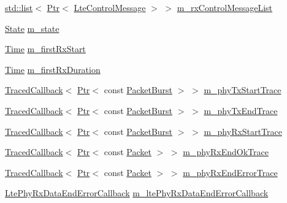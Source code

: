 \begin{DoxyCompactItemize}
\hyperlink{openflow-interface_8h_afd9bcfa176617760671b67580f536fa7}{std\+::list}$<$ \hyperlink{classns3_1_1Ptr}{Ptr}$<$ \hyperlink{classns3_1_1LteControlMessage}{Lte\+Control\+Message} $>$ $>$ \hyperlink{classns3_1_1LteSpectrumPhy_ad0e520fb4b440e47e9d2b17b3c5fd05d}{m\+\_\+rx\+Control\+Message\+List}
\item 
\hyperlink{classns3_1_1LteSpectrumPhy_a52ce2cf9b4846807449c50399f6b8000}{State} \hyperlink{classns3_1_1LteSpectrumPhy_a985b6688f1bbfcd8703096040b5c9b10}{m\+\_\+state}
\item 
\hyperlink{classns3_1_1Time}{Time} \hyperlink{classns3_1_1LteSpectrumPhy_a6b6c77a9ac1262136b08bcd88eb5c82e}{m\+\_\+first\+Rx\+Start}
\item 
\hyperlink{classns3_1_1Time}{Time} \hyperlink{classns3_1_1LteSpectrumPhy_a9dbb2b47df4bfc5d78bff2ed21a4cad8}{m\+\_\+first\+Rx\+Duration}
\item 
\hyperlink{classns3_1_1TracedCallback}{Traced\+Callback}$<$ \hyperlink{classns3_1_1Ptr}{Ptr}$<$ const \hyperlink{classns3_1_1PacketBurst}{Packet\+Burst} $>$ $>$ \hyperlink{classns3_1_1LteSpectrumPhy_a51240ee46496b84e08f0e8101c74fcfc}{m\+\_\+phy\+Tx\+Start\+Trace}
\item 
\hyperlink{classns3_1_1TracedCallback}{Traced\+Callback}$<$ \hyperlink{classns3_1_1Ptr}{Ptr}$<$ const \hyperlink{classns3_1_1PacketBurst}{Packet\+Burst} $>$ $>$ \hyperlink{classns3_1_1LteSpectrumPhy_a0c6aa04be77ea12d62acc1c71dcd2658}{m\+\_\+phy\+Tx\+End\+Trace}
\item 
\hyperlink{classns3_1_1TracedCallback}{Traced\+Callback}$<$ \hyperlink{classns3_1_1Ptr}{Ptr}$<$ const \hyperlink{classns3_1_1PacketBurst}{Packet\+Burst} $>$ $>$ \hyperlink{classns3_1_1LteSpectrumPhy_a78dd3511fa6cb1facf9d6ce1b0d1b5a1}{m\+\_\+phy\+Rx\+Start\+Trace}
\item 
\hyperlink{classns3_1_1TracedCallback}{Traced\+Callback}$<$ \hyperlink{classns3_1_1Ptr}{Ptr}$<$ const \hyperlink{classns3_1_1Packet}{Packet} $>$ $>$ \hyperlink{classns3_1_1LteSpectrumPhy_ae9cf15930fd70025ee8d649ecb2624c6}{m\+\_\+phy\+Rx\+End\+Ok\+Trace}
\item 
\hyperlink{classns3_1_1TracedCallback}{Traced\+Callback}$<$ \hyperlink{classns3_1_1Ptr}{Ptr}$<$ const \hyperlink{classns3_1_1Packet}{Packet} $>$ $>$ \hyperlink{classns3_1_1LteSpectrumPhy_ad75cd3656be0d799015b3ab4667f60e2}{m\+\_\+phy\+Rx\+End\+Error\+Trace}
\item 
\hyperlink{namespacens3_a7b967f2fed4d92f6ec8a607ac493c535}{Lte\+Phy\+Rx\+Data\+End\+Error\+Callback} \hyperlink{classns3_1_1LteSpectrumPhy_aa5bf831566afe87218e586792a1f4863}{m\+\_\+lte\+Phy\+Rx\+Data\+End\+Error\+Callback}

\end{DoxyCompactItemize}
